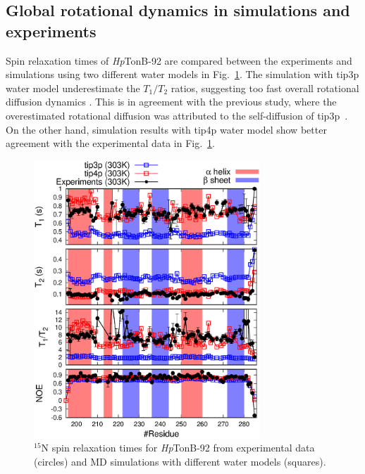 \documentclass[journal=jpcbfk,manuscript=article]{achemso}
\begin{document}
\subsection{Global rotational dynamics in simulations and experiments}
Spin relaxation times of {\it Hp}TonB-92 are compared 
between the experiments and simulations using two
different water models in Fig.~\ref{HpTonBrelaxationDATA}.
The simulation with tip3p water model underestimate the $T_1/T_2$ ratios, suggesting too
fast overall rotational diffusion dynamics \cite{carper97}.
This is in agreement with the previous study, where the overestimated
rotational diffusion was attributed to the self-diffusion of tip3p~\cite{wong08,takemura12,debiec16}.
On the other hand, simulation results with tip4p water model show 
better agreement with the experimental data in  Fig.~\ref{HpTonBrelaxationDATA}.
\begin{figure}[!h]
  \includegraphics[width=8.5cm]{../Figs/HpTonBrelaxationDATA.eps}%
  \caption{$^{15}$N spin relaxation times for {\it Hp}TonB-92 from experimental data (circles)
    and MD simulations with different water models (squares).
    \label{HpTonBrelaxationDATA}}%
\end{figure}
\end{document}
